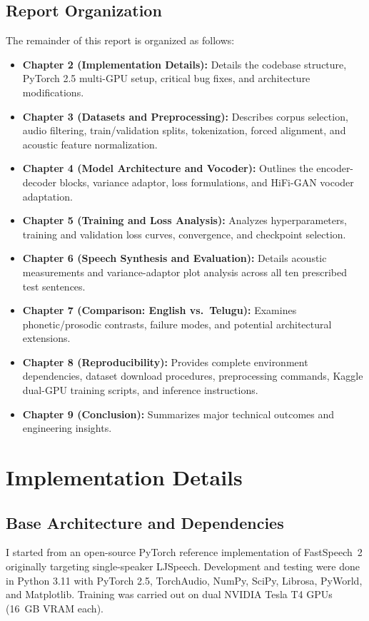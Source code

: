 \documentclass[11pt,a4paper]{report}
\begin{document}
\section{Report Organization}
The remainder of this report is organized as follows:
\begin{itemize}
    \item \textbf{Chapter 2 (Implementation Details):} Details the codebase structure, PyTorch 2.5 multi-GPU setup, critical bug fixes, and architecture modifications.
    \item \textbf{Chapter 3 (Datasets and Preprocessing):} Describes corpus selection, audio filtering, train/validation splits, tokenization, forced alignment, and acoustic feature normalization.
    \item \textbf{Chapter 4 (Model Architecture and Vocoder):} Outlines the encoder-decoder blocks, variance adaptor, loss formulations, and HiFi-GAN vocoder adaptation.
    \item \textbf{Chapter 5 (Training and Loss Analysis):} Analyzes hyperparameters, training and validation loss curves, convergence, and checkpoint selection.
    \item \textbf{Chapter 6 (Speech Synthesis and Evaluation):} Details acoustic measurements and variance-adaptor plot analysis across all ten prescribed test sentences.
    \item \textbf{Chapter 7 (Comparison: English vs.\ Telugu):} Examines phonetic/prosodic contrasts, failure modes, and potential architectural extensions.
    \item \textbf{Chapter 8 (Reproducibility):} Provides complete environment dependencies, dataset download procedures, preprocessing commands, Kaggle dual-GPU training scripts, and inference instructions.
    \item \textbf{Chapter 9 (Conclusion):} Summarizes major technical outcomes and engineering insights.
\end{itemize}

\FloatBarrier
\vspace{1.5em}

\chapter{Implementation Details}

\section{Base Architecture and Dependencies}
I started from an open-source PyTorch reference implementation of FastSpeech~2 originally targeting single-speaker LJSpeech. Development and testing were done in Python 3.11 with PyTorch 2.5, TorchAudio, NumPy, SciPy, Librosa, PyWorld, and Matplotlib. Training was carried out on dual NVIDIA Tesla T4 GPUs (16~GB VRAM each).
\end{document}
